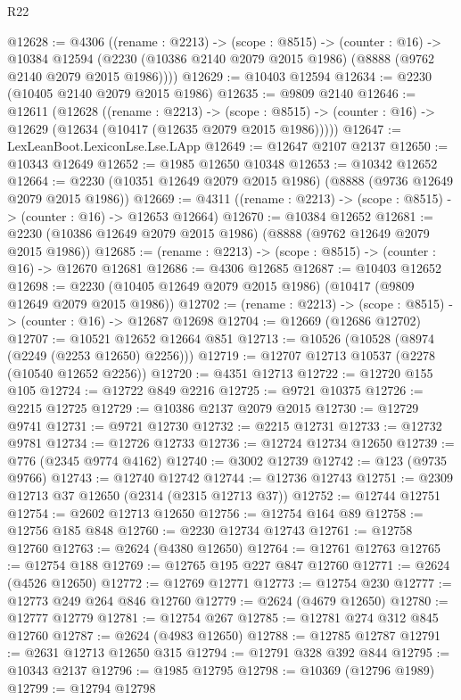 \begin{lexlean}{R22}
\begin{coremodule}
@12628 := @4306
    ((rename : @2213) ->
    (scope : @8515) ->
    (counter : @16) ->
    @10384 @12594 (@2230 (@10386 @2140 @2079 @2015 @1986) (@8888 (@9762 @2140 @2079 @2015 @1986))))
@12629 := @10403 @12594
@12634 := @2230 (@10405 @2140 @2079 @2015 @1986)
@12635 := @9809 @2140
@12646 := @12611
    (@12628
      ((rename : @2213) ->
      (scope : @8515) -> (counter : @16) -> @12629 (@12634 (@10417 (@12635 @2079 @2015 @1986)))))
@12647 := LexLeanBoot.LexiconLse.Lse.LApp
@12649 := @12647 @2107 @2137
@12650 := @10343 @12649
@12652 := @1985 @12650 @10348
@12653 := @10342 @12652
@12664 := @2230 (@10351 @12649 @2079 @2015 @1986) (@8888 (@9736 @12649 @2079 @2015 @1986))
@12669 := @4311 ((rename : @2213) -> (scope : @8515) -> (counter : @16) -> @12653 @12664)
@12670 := @10384 @12652
@12681 := @2230 (@10386 @12649 @2079 @2015 @1986) (@8888 (@9762 @12649 @2079 @2015 @1986))
@12685 := (rename : @2213) -> (scope : @8515) -> (counter : @16) -> @12670 @12681
@12686 := @4306 @12685
@12687 := @10403 @12652
@12698 := @2230 (@10405 @12649 @2079 @2015 @1986) (@10417 (@9809 @12649 @2079 @2015 @1986))
@12702 := (rename : @2213) -> (scope : @8515) -> (counter : @16) -> @12687 @12698
@12704 := @12669 (@12686 @12702)
@12707 := @10521 @12652 @12664 @851
@12713 := @10526 (@10528 (@8974 (@2249 (@2253 @12650) @2256)))
@12719 := @12707 @12713 @10537 (@2278 (@10540 @12652 @2256))
@12720 := @4351 @12713
@12722 := @12720 @155 @105
@12724 := @12722 @849 @2216
@12725 := @9721 @10375
@12726 := @2215 @12725
@12729 := @10386 @2137 @2079 @2015
@12730 := @12729 @9741
@12731 := @9721 @12730
@12732 := @2215 @12731
@12733 := @12732 @9781
@12734 := @12726 @12733
@12736 := @12724 @12734 @12650
@12739 := @776 (@2345 @9774 @4162)
@12740 := @3002 @12739
@12742 := @123 (@9735 @9766)
@12743 := @12740 @12742
@12744 := @12736 @12743
@12751 := @2309 @12713 @37 @12650 (@2314 (@2315 @12713 @37))
@12752 := @12744 @12751
@12754 := @2602 @12713 @12650
@12756 := @12754 @164 @89
@12758 := @12756 @185 @848
@12760 := @2230 @12734 @12743
@12761 := @12758 @12760
@12763 := @2624 (@4380 @12650)
@12764 := @12761 @12763
@12765 := @12754 @188
@12769 := @12765 @195 @227 @847 @12760
@12771 := @2624 (@4526 @12650)
@12772 := @12769 @12771
@12773 := @12754 @230
@12777 := @12773 @249 @264 @846 @12760
@12779 := @2624 (@4679 @12650)
@12780 := @12777 @12779
@12781 := @12754 @267
@12785 := @12781 @274 @312 @845 @12760
@12787 := @2624 (@4983 @12650)
@12788 := @12785 @12787
@12791 := @2631 @12713 @12650 @315
@12794 := @12791 @328 @392 @844
@12795 := @10343 @2137
@12796 := @1985 @12795
@12798 := @10369 (@12796 @1989)
@12799 := @12794 @12798

\end{coremodule}
\end{lexlean}
